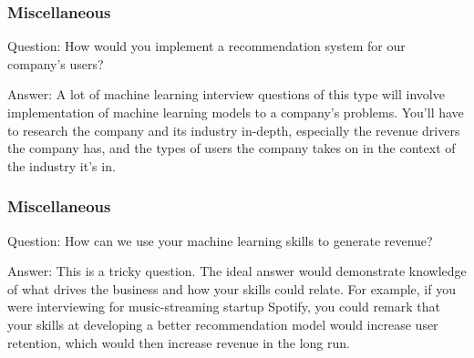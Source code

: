 \documentclass[11pt]{beamer}
\begin{document}
\begin{frame}
\frametitle{Miscellaneous}
\begin{block}{Question:}
	How would you implement a recommendation system for our company’s users?
\end{block}
\begin{block}{Answer:}
	A lot of machine learning interview questions of this type will involve implementation of machine learning models to a company’s problems. You’ll have to research the company and its industry in-depth, especially the revenue drivers the company has, and the types of users the company takes on in the context of the industry it’s in.
\end{block}
\end{frame}

\begin{frame}
\frametitle{Miscellaneous}
\begin{block}{Question:}
	How can we use your machine learning skills to generate revenue?
\end{block}
\begin{block}{Answer:}
	This is a tricky question. The ideal answer would demonstrate knowledge of what drives the business and how your skills could relate. For example, if you were interviewing for music-streaming startup Spotify, you could remark that your skills at developing a better recommendation model would increase user retention, which would then increase revenue in the long run.
\end{block}
\end{frame}
\end{document}
